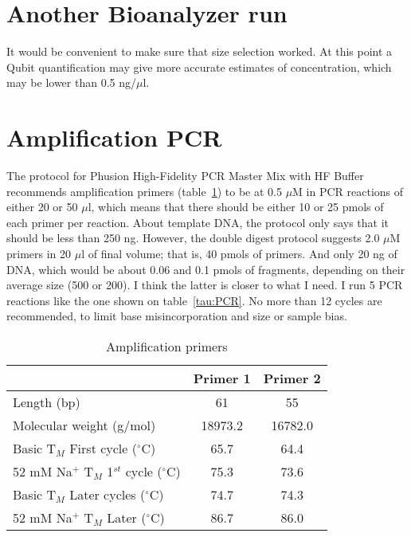 \documentclass[a4paper,12pt]{article}
\begin{document}
\section{Another Bioanalyzer run}
It would be convenient to make sure that size selection worked. At this point a Qubit quantification may give more accurate estimates of concentration, which may be lower than 0.5 ng/$\mu$l.

\section{Amplification PCR}
The protocol for Phusion High-Fidelity PCR Master Mix with HF Buffer recommends amplification primers (table~\ref{tau:primers}) to be at 0.5 $\mu$M in PCR reactions of either 20 or 50 $\mu$l, which means that there should be either 10 or 25 pmols of each primer per reaction. About template DNA, the protocol only says that it should be less than 250 ng. However, the double digest protocol \cite{Peterson2012} suggests 2.0 $\mu$M primers in 20 $\mu$l of final volume; that is, 40 pmols of primers. And only 20 ng of DNA, which would be about 0.06 and 0.1 pmols of fragments, depending on their average size (500 or 200). I think the latter is closer to what I need. I run 5 PCR reactions like the one shown on table~\ref{tau:PCR}. No more than 12 cycles are recommended, to limit base misincorporation and size or sample bias.

\begin{table}
\begin{center}
\caption{Amplification primers}\label{tau:primers}
\vspace*{0.2cm}
\begin{tabular}{lcc}
\toprule
&Primer 1&Primer 2\\
\midrule
Length (bp)&61&55\\
Molecular weight (g/mol)&18973.2&16782.0\\
Basic T$_M$ First cycle ($^{\circ}$C)&65.7&64.4\\
52 mM Na$^{+}$ T$_M$ 1$^{st}$ cycle ($^{\circ}$C)&75.3&73.6\\
Basic T$_M$ Later cycles ($^{\circ}$C)&74.7&74.3\\
52 mM Na$^{+}$ T$_M$ Later ($^{\circ}$C)&86.7&86.0\\
\bottomrule
\end{tabular}
\end{center}
\end{table}
\end{document}
